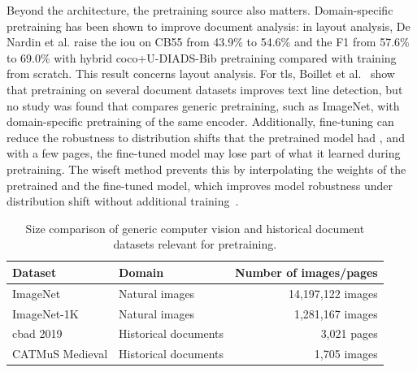 Beyond the architecture, the pretraining source also matters. Domain-specific pretraining has been shown to improve document analysis: in layout analysis, De Nardin et al. \cite{denardin2025indomain} raise the \gls{iou} on CB55 from 43.9\% to 54.6\% and the F1 from 57.6\% to 69.0\% with hybrid \gls{coco}+U-DIADS-Bib pretraining compared with training from scratch. This result concerns layout analysis. For \gls{tls}, Boillet et al.~\cite{boillet2021docufcn} show that pretraining on several document datasets improves text line detection, but no study was found that compares generic pretraining, such as ImageNet, with domain-specific pretraining of the same encoder. Additionally, fine-tuning can reduce the robustness to distribution shifts that the pretrained model had \cite{wortsman2022wiseft}, and with a few pages, the fine-tuned model may lose part of what it learned during pretraining. The \gls{wiseft} method prevents this by interpolating the weights of the pretrained and the fine-tuned model, which improves model robustness under distribution shift without additional training~\cite{wortsman2022wiseft}.

	
\begin{table}[htbp]
	\centering
	\caption{Size comparison of generic computer vision and historical document datasets relevant for pretraining.}
	\label{tab:pretraining_datasets}
	\begin{tabular}{llr}
		\toprule
		Dataset & Domain & Number of images/pages \\
		\midrule
		ImageNet \cite{deng2009imagenet}
		& Natural images & 14,197,122 images \\
		
		ImageNet-1K \cite{russakovsky2015imagenet}
		& Natural images & 1,281,167 images \\
		
		\gls{cbad} 2019 \cite{cbad-2019}
		& Historical documents & 3,021 pages \\
		
		CATMuS Medieval \cite{catmus-medieval}
		& Historical documents & 1,705 images \\
		\bottomrule
	\end{tabular}
\end{table}
